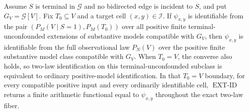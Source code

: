 Assume \(S\) is terminal in \(\mathcal G\) and no bidirected edge is incident to \(S\), and put \(G_V=\mathcal G[V]\). Fix \(T_0\subseteq V\) and a target cell \((x,y)\in\mathcal I\). If \(\psi_{x,y}\) is identifiable from the pair \((P_M(V\mid S=1),P_M(T_0))\) over all positive finite terminal-unconfounded extensions of substantive models compatible with \(G_V\), then \(\psi_{x,y}\) is identifiable from the full observational law \(P_N(V)\) over the positive finite substantive model class compatible with \(G_V\). When \(T_0=V\), the converse also holds, so two-law identification on this terminal-unconfounded subclass is equivalent to ordinary positive-model identification. In that \(T_0=V\) boundary, for every compatible positive input and every ordinarily identifiable cell, \(\operatorname{EXT\text{-}ID}\) returns a finite arithmetic functional equal to \(\psi_{x,y}\) throughout the exact two-law fiber.